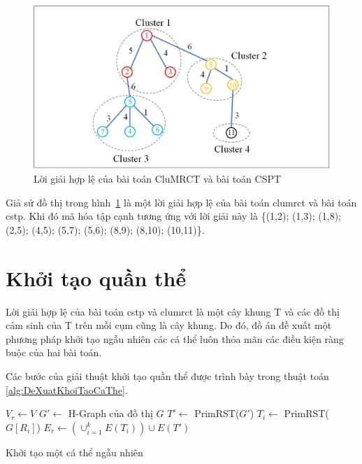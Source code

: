 \renewcommand{\scalefigure}{0.5}
\begin{figure}[htbp]
	\centering		
	\includegraphics[scale=\scalefigure]{Pictures/Ind_representation/Ind_Representation.png}
	\centering
	\caption{Lời giải hợp lệ của bài toán CluMRCT và bài toán CSPT}
	\label{fig:ind_representation}
\end{figure}

Giả sử đồ thị trong hình~\ref{fig:ind_representation} là một lời giải hợp lệ của bài toán \gls{clumrct} và bài toán \gls{cstp}. Khi đó mã hóa tập cạnh tương ứng với lời giải này là \{(1,2); (1,3); (1,8); (2,5); (4,5); (5,7); (5,6); (8,9); (8,10); (10,11)\}.


\section{Khởi tạo quần thể} \label{chap_mfeaProposed:sec:khoitaoquanthe}
Lời giải hợp lệ của bài toán \gls{cstp} và \gls{clumrct} là một cây khung T và các đồ thị cảm sinh của T trên mỗi cụm cũng là cây khung. Do đó, đồ án đề xuất một phương pháp khởi tạo ngẫu nhiên các cá thể luôn thỏa mãn các điều kiện ràng buộc của hai bài toán.

Các bước của giải thuật khởi tạo quần thể được trình bày trong thuật toán \ref{alg:DeXuatKhoiTaoCaThe}.
\begin{algorithm}[htb]
		\BlankLine
	\Begin
	{	
		$V_r \leftarrow V$\;
		$G' \leftarrow$ H-Graph của đồ thị $G$\;
		$T' \leftarrow$ PrimRST($G'$) \;
		{
			$T_i \leftarrow$ PrimRST($G[R_i]$) \;
		}
		$E_r \leftarrow \left( \cup_{i=1}^{k} E(T_i) \right)\cup E(T')$ \;
	}
	\caption{Khởi tạo một cá thể ngẫu nhiên}
	\label{alg:DeXuatKhoiTaoCaThe}
\end{algorithm}

